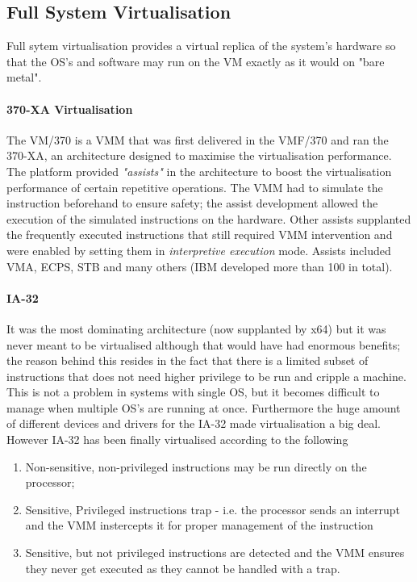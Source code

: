 \documentclass[paper=a4, fontsize=11pt]{report} %
\numberwithin{equation}{section} %
\numberwithin{figure}{section} %
\numberwithin{table}{section} %
\begin{document}
\subsection{Full System Virtualisation}
Full sytem virtualisation provides a virtual replica of the system's hardware 
so that the OS's and software may run on the VM exactly as it would on "bare 
metal".
\paragraph{370-XA Virtualisation} The VM/370 is a VMM that was first delivered 
in the VMF/370 and ran the 370-XA, an architecture designed to maximise the 
virtualisation performance. The platform provided \textit{"assists"} in the 
architecture to boost the virtualisation performance of certain repetitive 
operations. The VMM had to simulate the instruction beforehand to ensure 
safety; the assist development allowed the execution of the simulated 
instructions on the hardware. Other assists supplanted the frequently executed 
instructions that still required VMM intervention and were enabled by setting 
them in \textit{interpretive execution} mode. Assists included VMA, ECPS, STB 
and many others (IBM developed more than 100 in total).
\paragraph{IA-32} It was the most dominating architecture (now supplanted by 
x64) but it was never meant to be virtualised although that would have had 
enormous benefits; the reason behind this resides in the fact that there is a 
limited subset of instructions that does not need higher privilege to be run 
and cripple a machine. This is not a problem in systems with single OS, but it 
becomes difficult to manage when multiple OS's are running at once. Furthermore 
the huge amount of different devices and drivers for the IA-32 made 
virtualisation a big deal. However IA-32 has been finally virtualised according 
to the following
\begin{enumerate}
	\item Non-sensitive, non-privileged instructions may be run directly on the 
	processor;
	\item Sensitive, Privileged instructions trap - i.e. the processor sends an 
	interrupt and the VMM instercepts it for proper management of the 
	instruction
	\item Sensitive, but not privileged instructions are detected and the VMM 
	ensures they never get executed as they cannot be handled with a trap.
\end{enumerate}
\end{document}
